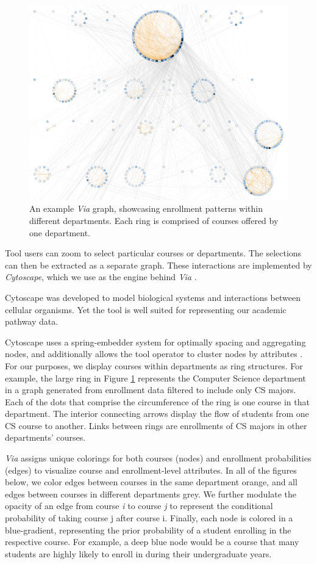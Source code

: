 \begin{figure}
    \centering
    \includegraphics[width=\columnwidth]{Figs/final-overview.pdf}
    \caption{An example {\em Via} graph, showcasing enrollment
      patterns within different departments. Each ring is comprised of
      courses offered by one department.}
    \label{fig:overview}
\end{figure}
Tool users can zoom to select particular courses or
departments. The selections can then be extracted as a separate
graph. These interactions are implemented by \textit{Cytoscape}, which
we use as the engine behind {\em Via} \cite{shannon2003cytoscape}.

Cytoscape was developed to model biological systems and interactions
between cellular organisms. Yet the tool is well suited for
representing our academic pathway data.

Cytoscape uses a spring-embedder system for optimally spacing and
aggregating nodes, and additionally allows the tool operator to
cluster nodes by attributes \cite{Battista1994}. For our purposes, we
display courses within departments as ring structures. For example,
the large ring in Figure \ref{fig:overview} represents the Computer
Science department in a graph generated from enrollment data filtered
to include only CS majors. Each of the dots that comprise the
circumference of the ring is one course in that department. The
interior connecting arrows display the flow of students from one CS
course to another. Links between rings are enrollments of CS majors in
other departments' courses.

{\em Via} assigns unique colorings for both courses (nodes) and
enrollment probabilities (edges) to visualize course and
enrollment-level attributes. In all of the figures below, we color
edges between courses in the same department orange, and all edges
between courses in different departments grey. We further modulate the
opacity of an edge from course \textit{i} to course \textit{j} to
represent the conditional probability of taking course j after course
i. Finally, each node is colored in a blue-gradient, representing the
prior probability of a student enrolling in the respective course. For
example, a deep blue node would be a course that many students are
highly likely to enroll in during their undergraduate years.

